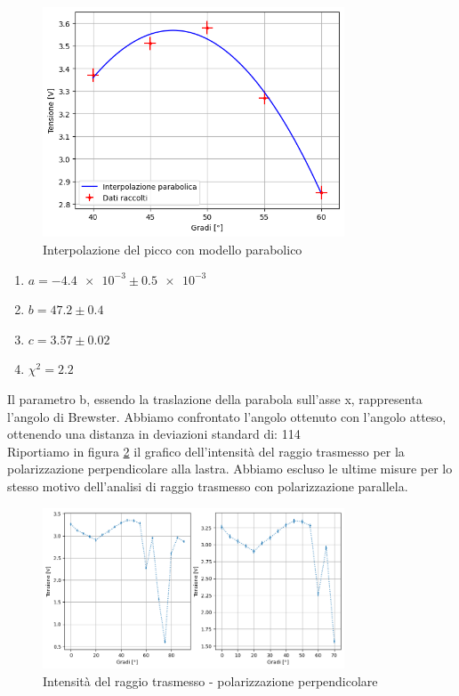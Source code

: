 \documentclass[letterpaper,12pt]{article}
\begin{document}
\begin{figure}[h!]
	\centering
	\includegraphics[width = 0.8\textwidth]{brew_angle.png}
	\caption{Interpolazione del picco con modello parabolico}
	\label{fig:parabola}
\end{figure}

\begin{enumerate}
	\item $a = \num{-4.4e-3}  \pm \num{0.5e-3}$
	\item $b = 47.2 \pm 0.4$
	\item $c = 3.57 \pm 0.02$
	\item $\chi^2 = 2.2$
\end{enumerate}

Il parametro b, essendo la traslazione della parabola sull'asse x, rappresenta l'angolo di Brewster. Abbiamo
confrontato l'angolo ottenuto con l'angolo atteso, ottenendo una distanza in deviazioni standard di: 114\\

Riportiamo in figura \ref{fig:wrong_pol} il grafico dell'intensità del raggio trasmesso per la polarizzazione
perpendicolare alla lastra. Abbiamo escluso le ultime misure per lo stesso motivo dell'analisi di raggio trasmesso
con polarizzazione parallela.

\begin{figure}[h]
	\centering
	\includegraphics[width = 0.8\textwidth]{wrong_pol.png}
	\caption{Intensità del raggio trasmesso - polarizzazione perpendicolare}
	\label{fig:wrong_pol}
\end{figure}
\end{document}
